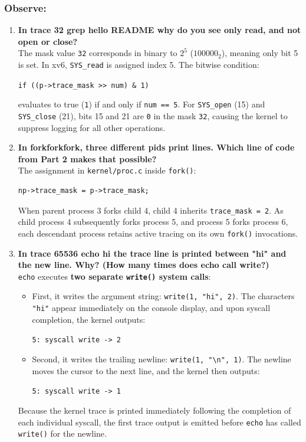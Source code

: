 \documentclass{labreport}
\begin{document}
\subsubsection*{Observe:}
\begin{enumerate}[leftmargin=*]
    \item \textbf{In trace 32 grep hello README why do you see only read, and not open or close?}\\[0.2em]
    The mask value \texttt{32} corresponds in binary to $2^5$ ($100000_2$), meaning only bit 5 is set. In xv6, \texttt{SYS\_read} is assigned index 5. The bitwise condition:
    \begin{center}
        \texttt{if ((p->trace\_mask >> num) \& 1)}
    \end{center}
    evaluates to true (\texttt{1}) if and only if \texttt{num == 5}. For \texttt{SYS\_open} (15) and \texttt{SYS\_close} (21), bits 15 and 21 are \texttt{0} in the mask \texttt{32}, causing the kernel to suppress logging for all other operations.

    \item \textbf{In forkforkfork, three different pids print lines. Which line of code from Part 2 makes that possible?}\\[0.2em]
    The assignment in \texttt{kernel/proc.c} inside \texttt{fork()}:
    \begin{lstlisting}[style=c]
np->trace_mask = p->trace_mask;
    \end{lstlisting}
    When parent process 3 forks child 4, child 4 inherits \texttt{trace\_mask = 2}. As child process 4 subsequently forks process 5, and process 5 forks process 6, each descendant process retains active tracing on its own \texttt{fork()} invocations.

    \item \textbf{In trace 65536 echo hi the trace line is printed between "hi" and the new line. Why? (How many times does echo call write?)}\\[0.2em]
    \texttt{echo} executes \textbf{two separate \texttt{write()} system calls}:
    \begin{itemize}[noitemsep]
        \item First, it writes the argument string: \texttt{write(1, "hi", 2)}. The characters \texttt{"hi"} appear immediately on the console display, and upon syscall completion, the kernel outputs:
        \begin{center}
            \texttt{5: syscall write -> 2}
        \end{center}
        \item Second, it writes the trailing newline: \texttt{write(1, "\textbackslash n", 1)}. The newline moves the cursor to the next line, and the kernel then outputs:
        \begin{center}
            \texttt{5: syscall write -> 1}
        \end{center}
    \end{itemize}
    Because the kernel trace is printed immediately following the completion of each individual syscall, the first trace output is emitted before \texttt{echo} has called \texttt{write()} for the newline.


\end{enumerate}
\end{document}
